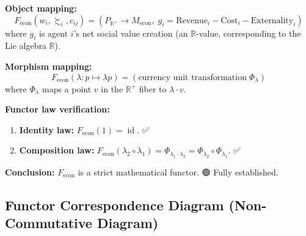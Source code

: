 \documentclass[12pt,a4paper]{article}
\theoremstyle{plain}
\theoremstyle{definition}
\newcommand{\R}{\mathbb{R}}
\newcommand{\BundleCat}{\mathbf{Bun}}
\DeclareMathOperator{\id}{id}
\begin{document}
\textbf{Object mapping:}
\begin{equation}
    F_{\text{econ}}(w_i, \succsim_i, c_{ij}) = (P_{\R^+} \to M_{\text{econ}}, \; g_i = \text{Revenue}_i - \text{Cost}_i - \text{Externality}_i)
\end{equation}
where $g_i$ is agent $i$'s net social value creation (an $\R$-value, corresponding to the Lie algebra $\R$).

\textbf{Morphism mapping:}
\begin{equation}
    F_{\text{econ}}(\lambda: p \mapsto \lambda p) = (\text{currency unit transformation}\; \Phi_\lambda)
\end{equation}
where $\Phi_\lambda$ maps a point $v$ in the $\R^+$ fiber to $\lambda \cdot v$.

\textbf{Functor law verification:}
\begin{enumerate}
    \item \textbf{Identity law:} $F_{\text{econ}}(1) = \id$. ✅
    \item \textbf{Composition law:} $F_{\text{econ}}(\lambda_2 \circ \lambda_1) = \Phi_{\lambda_1 \cdot \lambda_2} = \Phi_{\lambda_2} \circ \Phi_{\lambda_1}$. ✅
\end{enumerate}

\textbf{Conclusion:} $F_{\text{econ}}$ is a strict mathematical functor. 🟢 Fully established.

\newpage

\subsection{Functor Correspondence Diagram (Non-Commutative Diagram)}

\begin{center}
\end{center}
\end{document}
